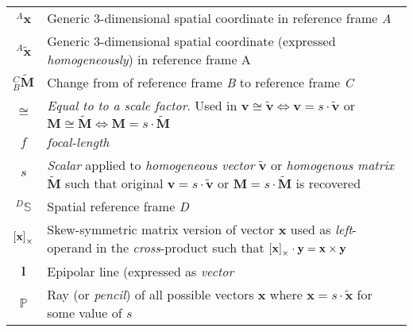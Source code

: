 \begin{longtable}{c p{10.5cm}}
$^{A}{\mathbf{x}}$ & Generic 3-dimensional spatial coordinate in reference frame \textit{A} \\
$^{A}{\mathbf{\tilde{x}}}$ & Generic 3-dimensional spatial coordinate (expressed \textit{homogeneously}) in reference frame {A}\\
$^{C}_{B}\mathbf{\tilde{M}}$ & Change from of reference frame \textit{B} to reference frame \textit{C}\\
$\cong$ & \textit{Equal to to a scale factor}. Used in $\mathbf{v}\cong\mathbf{\tilde{v}}\iff\mathbf{v}=s\cdot\mathbf{\tilde{v}}$ or $\mathbf{M}\cong\mathbf{\tilde{M}}\iff\mathbf{M}=s\cdot\mathbf{\tilde{M}}$\\
$f$ & \textit{focal-length}\\
$s$ & \textit{Scalar} applied to \textit{homogeneous vector} $\mathbf{\tilde{v}}$ or \textit{homogenous matrix} $\mathbf{\tilde{M}}$ such that original $\mathbf{v}=s\cdot\mathbf{\tilde{v}}$ or $\mathbf{M}=s\cdot\mathbf{\tilde{M}}$ is recovered\\
$^{D}\mathbb{S}$ & Spatial reference frame \textit{D}\\
$\left[\mathbf{x}\right]_{\times}$ & Skew-symmetric matrix version of vector $\mathbf{x}$ used as \textit{left}-operand in the \textit{cross}-product such that $\left[\mathbf{x}\right]_{\times}\cdot\mathbf{y}=\mathbf{x}\times\mathbf{y}$\\
$\mathbf{l}$ & Epipolar line (expressed as \textit{vector}\\
$\mathbb{P}$ & Ray (or \textit{pencil}) of all possible vectors $\mathbf{x}$ where $\mathbf{x}=s\cdot\mathbf{\tilde{x}}$ for some value of $s$\\
\bottomrule
\end{longtable}
\newpage

